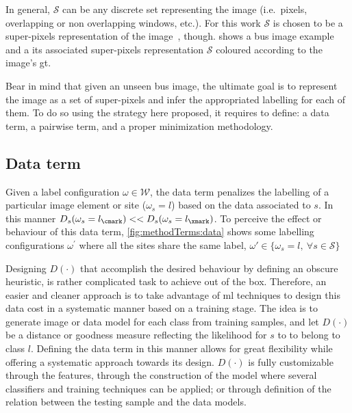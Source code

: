 In general, $\mathcal{S}$ can be any discrete set representing the image (i.e.\, pixels, overlapping or non overlapping windows, etc.). 
For this work $\mathcal{S}$ is chosen to be a super-pixels representation of the image~\cite{achanta2012slic}, though. 
 shows a \ac{bus} image example and a its associated super-pixels representation $\mathcal{S}$ coloured according to the image's \ac{gt}.

Bear in mind that given an unseen \ac{bus} image, the ultimate goal is to represent the image as a set of super-pixels and infer the appropriated labelling for each of them.
To do so using the strategy here proposed, it requires to define: a data term, a pairwise term, and a proper minimization methodology.

\subsection{Data term} \label{sec:method:dataTerm}

Given a label configuration $\omega \in \mathcal{W}$, the data term penalizes the 
labelling of a particular image element or site ($\omega_s = l$) based on the data associated to $s$. 
In this manner $D_s(\omega_s=l_\cmark) << D_s(\omega_s=l_\xmark)$. 
To perceive the effect or behaviour of this data term, \cref{fig:methodTerms:data} shows some labelling configurations $\omega^'$ where all the sites share the same label, $\omega' \in \{ \omega_s=l,~\forall s\in\mathcal{S}\}$

Designing $D(\cdot)$ that accomplish the desired behaviour by defining an obscure heuristic, is rather complicated task to achieve out of the box. 
Therefore, an easier and cleaner approach is to take advantage of \ac{ml} techniques to design this data cost in a systematic manner based on a training stage. 
The idea is to generate image or data model for each class from training samples, and let $D(\cdot)$ be a distance or goodness measure reflecting the likelihood for $s$ to to belong to class $l$.
Defining the data term in this manner allows for great flexibility while offering a systematic approach towards its design.  
$D(\cdot)$ is fully customizable through the features, through the construction of the model where several classifiers and training techniques can be applied; or through definition of the relation between the testing sample and the data models. 


